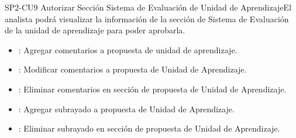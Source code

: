 \begin{UseCase}{SP2-CU9}{ Autorizar Sección Sistema de Evaluación de Unidad de Aprendizaje}{El analista podrá visualizar la información de la sección de Sistema de Evaluación  de la unidad de aprendizaje para poder aprobarla.}
{\begin{itemize}
        	\end{itemize}
        }
		{
		\begin{itemize}
			\item {}: Agregar comentarios a propuesta de unidad de aprendizaje.
			\item {}: Modificar comentarios a propuesta de Unidad de Aprendizaje.
			\item {}: Eliminar comentarios en sección de propuesta de Unidad de Aprendizaje.
			\item {}: Agregar subrayado a propuesta de Unidad de Aprendizaje.
			\item {}: Eliminar subrayado en sección de propuesta de Unidad de Aprendizaje.
		\end{itemize}
		}
\end{UseCase}

